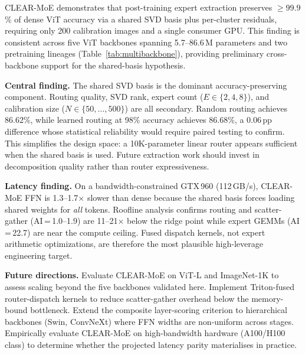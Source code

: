 \documentclass[conference]{IEEEtran}
\begin{document}
CLEAR-MoE demonstrates that post-training expert extraction preserves ${\geq}99.9$\% of dense ViT accuracy via a shared SVD basis plus per-cluster residuals, requiring only 200 calibration images and a single consumer GPU. This finding is consistent across five ViT backbones spanning 5.7--86.6\,M parameters and two pretraining lineages (Table~\ref{tab:multibackbone}), providing preliminary cross-backbone support for the shared-basis hypothesis.

\textbf{Central finding.} The shared SVD basis is the dominant accuracy-preserving component. Routing quality, SVD rank, expert count ($E\in\{2,4,8\}$), and calibration size ($N\in\{50,\ldots,500\}$) are all secondary. Random routing achieves 86.62\%, while learned routing at 98\% accuracy achieves 86.68\%, a 0.06\,pp difference whose statistical reliability would require paired testing to confirm. This simplifies the design space: a 10K-parameter linear router appears sufficient when the shared basis is used. Future extraction work should invest in decomposition quality rather than router expressiveness.

\textbf{Latency finding.} On a bandwidth-constrained GTX\,960 (112\,GB/s), CLEAR-MoE FFN is 1.3--1.7$\times$ slower than dense because the shared basis forces loading shared weights for \emph{all} tokens. Roofline analysis confirms routing and scatter-gather (AI\,=\,1.0--1.9) are 11--21$\times$ below the ridge point while expert GEMMs (AI\,=\,22.7) are near the compute ceiling. Fused dispatch kernels, not expert arithmetic optimizations, are therefore the most plausible high-leverage engineering target.

\textbf{Future directions.} Evaluate CLEAR-MoE on ViT-L and ImageNet-1K to assess scaling beyond the five backbones validated here. Implement Triton-fused router-dispatch kernels to reduce scatter-gather overhead below the memory-bound bottleneck. Extend the composite layer-scoring criterion to hierarchical backbones (Swin, ConvNeXt) where FFN widths are non-uniform across stages. Empirically evaluate CLEAR-MoE on high-bandwidth hardware (A100/H100 class) to determine whether the projected latency parity materialises in practice.
\end{document}
